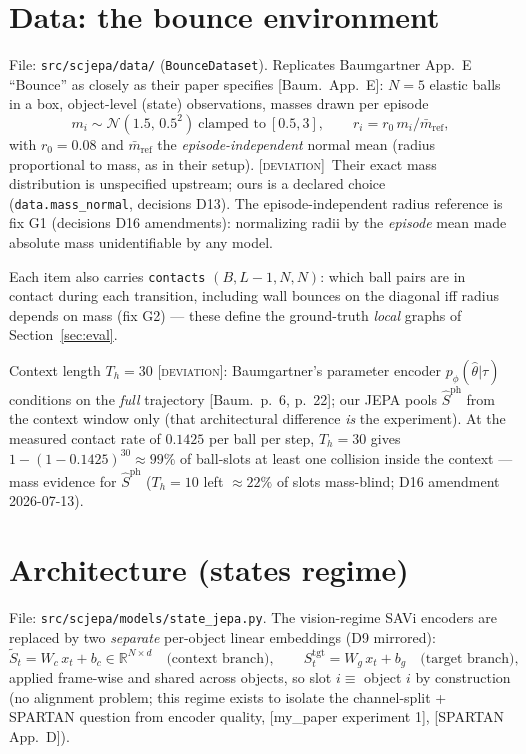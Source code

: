 \documentclass[11pt]{article}
\newcommand{\code}[1]{\texttt{\small #1}}
\newcommand{\paper}[1]{\textcolor{blue!60!black}{[#1]}}
\newcommand{\dev}{\textcolor{red!70!black}{[\textsc{deviation}]}}
\newcommand{\Sph}{\hat{S}^{\mathrm{ph}}}
\begin{document}
\section{Data: the bounce environment}
\label{sec:data}
File: \code{src/scjepa/data/} (\code{BounceDataset}). Replicates Baumgartner App.~E
``Bounce'' as closely as their paper specifies \paper{Baum.\ App.~E}: $N=5$ elastic balls in
a box, object-level (state) observations, masses drawn per episode
\[
  m_i \sim \mathcal N(1.5,\,0.5^2)\ \text{clamped to}\ [0.5,3],
  \qquad r_i = r_0\, m_i / \bar m_{\mathrm{ref}},
\]
with $r_0=0.08$ and $\bar m_{\mathrm{ref}}$ the \emph{episode-independent} normal mean
(radius proportional to mass, as in their setup). \dev{}~Their exact mass distribution is
unspecified upstream; ours is a declared choice (\code{data.mass\_normal}, decisions D13).
The episode-independent radius reference is fix G1 (decisions D16 amendments): normalizing
radii by the \emph{episode} mean made absolute mass unidentifiable by any model.

Each item also carries \code{contacts} $(B,L-1,N,N)$: which ball pairs are in contact
during each transition, including wall bounces on the diagonal iff radius depends on mass
(fix G2) --- these define the ground-truth \emph{local} graphs of
Section~\ref{sec:eval}.

Context length $T_h=30$ \dev{}: Baumgartner's parameter encoder $p_\phi(\hat\theta|\tau)$
conditions on the \emph{full} trajectory \paper{Baum.\ p.~6, p.~22}; our JEPA pools $\Sph$
from the context window only (that architectural difference \emph{is} the experiment). At
the measured contact rate of $0.1425$ per ball per step, $T_h=30$ gives
$1-(1-0.1425)^{30}\approx 99\%$ of ball-slots at least one collision inside the context ---
mass evidence for $\Sph$ ($T_h=10$ left $\approx22\%$ of slots mass-blind; D16 amendment
2026-07-13).

\section{Architecture (states regime)}
\label{sec:arch}
File: \code{src/scjepa/models/state\_jepa.py}. The vision-regime SAVi encoders are replaced
by two \emph{separate} per-object linear embeddings (D9 mirrored):
\[
  \tilde S_{t} = W_c\, x_t + b_c \in \mathbb{R}^{N\times d}
  \quad\text{(context branch)},\qquad
  S^{\mathrm{tgt}}_{t} = W_g\, x_t + b_g
  \quad\text{(target branch)},
\]
applied frame-wise and shared across objects, so slot $i \equiv$ object $i$ by construction
(no alignment problem; this regime exists to isolate the channel-split + SPARTAN question
from encoder quality, \paper{my\_paper experiment 1}, \paper{SPARTAN App.~D}).
\end{document}
